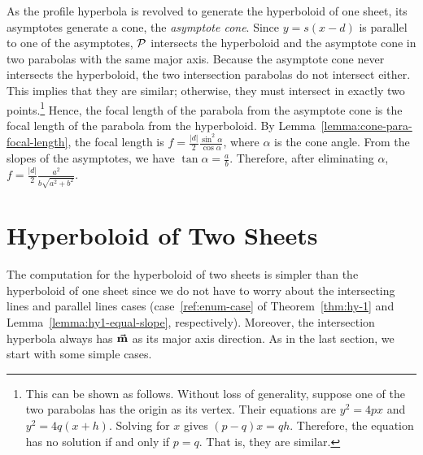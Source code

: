      As the profile hyperbola is revolved to generate the hyperboloid
of one sheet, its asymptotes generate a cone, the {\em asymptote cone}.
Since $y=s(x-d)$ is parallel to one of the asymptotes, ${\cal P}$ intersects
the hyperboloid and the asymptote cone in two parabolas with the same major
axis.  Because the asymptote cone never intersects the hyperboloid, the two
intersection parabolas do not intersect either.  This implies that they
are similar; otherwise, they must intersect in exactly two
points.\footnote{This can be shown as follows.  Without loss of generality,
suppose one of the two parabolas has the origin as its vertex.  Their
equations are $y^2=4px$ and $y^2=4q(x+h)$.  Solving for $x$ gives
$(p-q)x=qh$.  Therefore, the equation has no solution if and only if $p=q$.
That is, they are similar.} Hence, the focal length of the parabola from the
asymptote cone is the focal length of the parabola from the hyperboloid.
By Lemma~\ref{lemma:cone-para-focal-length}, the focal length is
$f=\frac{|d|}{2}\frac{\sin^2\alpha}{\cos\alpha}$, where $\alpha$ is the cone
angle.  From the slopes of the asymptotes, we have $\tan\alpha=\frac{a}{b}$.
Therefore, after eliminating $\alpha$,
$f=\frac{|d|}{2}\frac{a^2}{b\sqrt{a^2+b^2}}$. \QED


\section{Hyperboloid of Two Sheets}
\label{section:hy2}

     The computation for the hyperboloid of two sheets is simpler than the
hyperboloid of one sheet since we do not have to worry about the intersecting
lines and parallel lines cases (case~\ref{ref:enum-case} of
Theorem~\ref{thm:hy-1} and Lemma~\ref{lemma:hy1-equal-slope}, respectively).
Moreover, the intersection hyperbola always has
$\vec{\bf m}$ as its major axis direction.  As in the last section, we start
with some simple cases.

